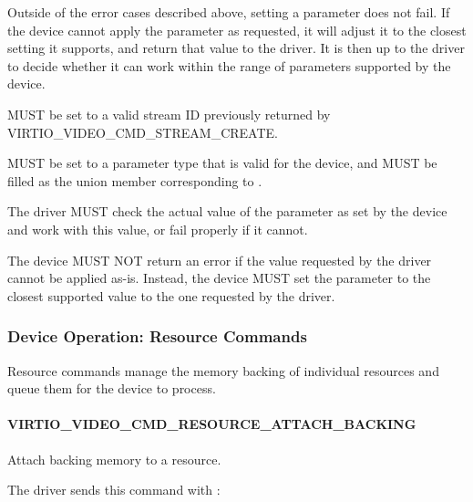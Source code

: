 Outside of the error cases described above, setting a parameter does not
fail. If the device cannot apply the parameter as requested, it will
adjust it to the closest setting it supports, and return that value to
the driver. It is then up to the driver to decide whether it can work
within the range of parameters supported by the device.


 MUST be set to a valid stream ID previously returned
by VIRTIO_VIDEO_CMD_STREAM_CREATE.

 MUST be set to a parameter type that is valid for the
device, and  MUST be filled as the union member
corresponding to .

The driver MUST check the actual value of the parameter as set by the
device and work with this value, or fail properly if it cannot.


The device MUST NOT return an error if the value requested by the driver
cannot be applied as-is. Instead, the device MUST set the parameter to
the closest supported value to the one requested by the driver.

\subsubsection{Device Operation: Resource Commands}\label{sec:Device Types / Video Device / Device Operation / Device Operation: Resource Commands}

Resource commands manage the memory backing of individual resources and
queue them for the device to process.

\paragraph{VIRTIO_VIDEO_CMD_RESOURCE_ATTACH_BACKING}\label{sec:Device Types / Video Device / Device Operation / Device Operation: Resource Commands / VIRTIO_VIDEO_CMD_RESOURCE_ATTACH_BACKING}

Attach backing memory to a resource.

The driver sends this command with
:

